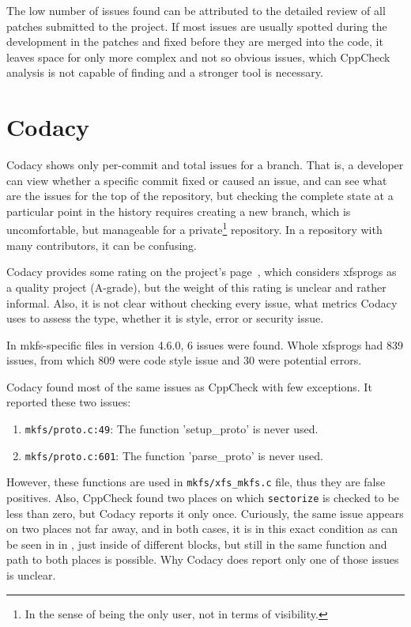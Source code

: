 The low number of issues found can be attributed to the detailed review of all
patches submitted to the project. If most issues are usually spotted during the
development in the patches and fixed before they are merged into the code, it
leaves space for only more complex and not so obvious issues, which CppCheck
analysis is not capable of finding and a stronger tool is necessary.

\section{Codacy}\label{chap:results:codacy}
Codacy shows only per-commit and total issues for a branch. That is, a
developer can view whether a specific commit fixed or caused an issue, and
can see what are the issues for the top of the repository, but checking the
complete state at a particular point in the history requires creating a new
branch, which is uncomfortable, but manageable for a private\footnote{In
the sense of being the only user, not in terms of visibility.} repository.
In a repository with many contributors, it can be confusing.

Codacy provides some rating on the project's page~\cite{codacyXfsprogs},
which considers xfsprogs as a quality project (A-grade), but the weight of
this rating is unclear and rather informal. Also, it is not clear without
checking every issue, what metrics Codacy uses to assess the type, whether
it is style, error or security issue.

In mkfs-specific files in version 4.6.0, 6 issues were found. Whole
xfsprogs had 839 issues, from which 809 were code style issue and 30 were
potential errors.

Codacy found most of the same issues as CppCheck with few exceptions. It
reported these two issues:
\begin{enumerate}
	\item {\tt mkfs/proto.c:49}: The function 'setup\_proto' is never used.
	\item {\tt mkfs/proto.c:601}: The function 'parse\_proto' is never used.
\end{enumerate}

However, these functions are used in {\tt mkfs/xfs\_mkfs.c} file, thus they are
false positives. Also, CppCheck found two places on which {\tt sectorize} is
checked to be less than zero, but Codacy reports it only once. Curiously, the
same issue appears on two places not far away, and in both cases, it is in this
exact condition as can be seen in  in
, just inside of different blocks, but still in the
same function and path to both places is possible. Why Codacy does report only
one of those issues is unclear.


